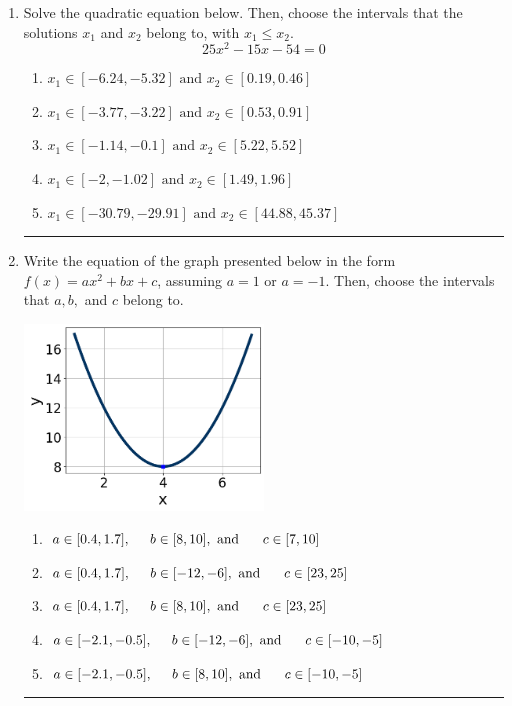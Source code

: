 \documentclass[14pt]{extbook}
\newcommand{\litem}[1]{\item#1\hspace*{-1cm}\rule{\textwidth}{0.4pt}}
\begin{document}
\begin{enumerate}
{\begin{enumerate}[label=\Alph*.]
\end{enumerate} }
\litem{
Solve the quadratic equation below. Then, choose the intervals that the solutions $x_1$ and $x_2$ belong to, with $x_1 \leq x_2$.\[ 25x^{2} -15 x -54 = 0 \]\begin{enumerate}[label=\Alph*.]
\item \( x_1 \in [-6.24, -5.32] \text{ and } x_2 \in [0.19, 0.46] \)
\item \( x_1 \in [-3.77, -3.22] \text{ and } x_2 \in [0.53, 0.91] \)
\item \( x_1 \in [-1.14, -0.1] \text{ and } x_2 \in [5.22, 5.52] \)
\item \( x_1 \in [-2, -1.02] \text{ and } x_2 \in [1.49, 1.96] \)
\item \( x_1 \in [-30.79, -29.91] \text{ and } x_2 \in [44.88, 45.37] \)

\end{enumerate} }
\litem{
Write the equation of the graph presented below in the form $f(x)=ax^2+bx+c$, assuming  $a=1$ or $a=-1$. Then, choose the intervals that $a, b,$ and $c$ belong to.
\begin{center}
    \includegraphics[width=0.5\textwidth]{../Figures/quadraticGraphToEquationCopyC.png}
\end{center}
\begin{enumerate}[label=\Alph*.]
\item \( a \in [0.4, 1.7], \hspace*{5mm} b \in [8, 10], \text{ and } \hspace*{5mm} c \in [7, 10] \)
\item \( a \in [0.4, 1.7], \hspace*{5mm} b \in [-12, -6], \text{ and } \hspace*{5mm} c \in [23, 25] \)
\item \( a \in [0.4, 1.7], \hspace*{5mm} b \in [8, 10], \text{ and } \hspace*{5mm} c \in [23, 25] \)
\item \( a \in [-2.1, -0.5], \hspace*{5mm} b \in [-12, -6], \text{ and } \hspace*{5mm} c \in [-10, -5] \)
\item \( a \in [-2.1, -0.5], \hspace*{5mm} b \in [8, 10], \text{ and } \hspace*{5mm} c \in [-10, -5] \)


\end{enumerate}}
\end{enumerate}
\end{document}
